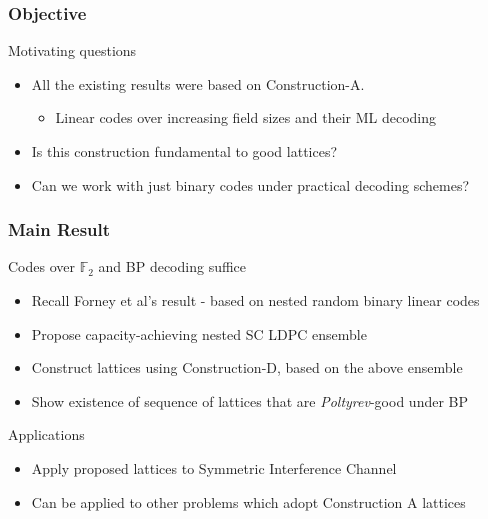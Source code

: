 \documentclass[10pt,presentation]{beamer}
\begin{document}
\begin{frame}\frametitle{Objective}
\begin{defn}{Motivating questions}
	\begin{itemize}
		\item All the existing results were based on Construction-A.
		\begin{itemize}
				\item Linear codes over \alert{ increasing field sizes} and their ML decoding 
		\end{itemize}
		\item<2-> Is this construction fundamental to good lattices?
		\item<2-> Can we work with just {\blue binary codes} under {\blue practical decoding} schemes?
	\end{itemize}
\end{defn}
\end{frame}

\begin{frame}\frametitle{Main Result}
			\begin{defn}{Codes over $\mathbb{F}_{2}$ and BP decoding suffice}
				\vspace{1em}
	\begin{itemize}
			\item Recall Forney et al's result - based on nested random binary linear codes
			\item Propose capacity-achieving nested SC LDPC ensemble
			\item Construct lattices using Construction-D, based on the above ensemble
			\item Show existence of sequence of lattices that are \textit{Poltyrev}-good under BP 
	\end{itemize}			
			\end{defn}
\pause
\vspace{2em}
		\begin{block}{Applications}
			    \begin{itemize}
        \item Apply proposed lattices to {\blue Symmetric Interference Channel}
        \item Can be applied to other problems which adopt Construction A lattices
    			\end{itemize}
		\end{block}
\end{frame}
\end{document}
